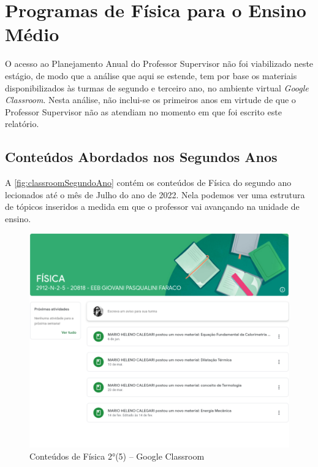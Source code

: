 \chapter{Programas de Física para o Ensino Médio}
\label{cap: prgFisica}
O acesso ao Planejamento Anual do Professor Supervisor não foi viabilizado neste estágio, de modo que a análise que aqui se estende, tem por base os materiais disponibilizados às turmas de segundo e terceiro ano, no ambiente virtual \emph{Google Classroom}. Nesta análise, não inclui-se os primeiros anos em virtude de que o Professor Supervisor não as atendiam no momento em que foi escrito este relatório.

\section{Conteúdos Abordados nos Segundos Anos}
A \autoref{fig:classroomSegundoAno} contém os conteúdos de Física do segundo ano lecionados até o mês de Julho do ano de 2022. Nela podemos ver uma estrutura de tópicos inseridos a medida em que o professor vai avançando na unidade de ensino.
\vspace{.5cm} 
\begin{figure}[!htpb]
    \begin{center}
        \includegraphics[width=.95\textwidth]{03-elementos/03.2_textual/03.2.1_fig/programaFisica2-5.png}
        \caption{Conteúdos de Física 2°(5) -- Google Classroom}
        \label{fig:classroomSegundoAno}
    \end{center}    
\end{figure}

